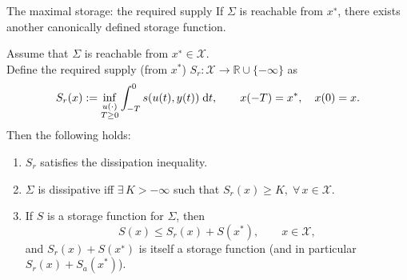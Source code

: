 \documentclass[aspectratio=169]{beamer}
\newcommand{\bbR}{\mathbb{R}}
\begin{document}
\begin{frame}{The maximal storage: the required supply}
	If $\Sigma$ is reachable from $x^∗$, there
	exists another canonically defined storage function. 
\begin{theorem}
	Assume that $\Sigma$ is reachable from $x^∗ \in \mathcal{X}$. \\
	Define the required supply (from $x^*$) $S_r : \mathcal{X} \rightarrow \bbR \cup \{-\infty\}$ as
\begin{equation}\label{eq:Sr}
	S_r(x) := \inf_{\substack{u(\cdot) \\ T \ge 0}} \int_{-T}^0 s(u(t), y(t)) \d t, \qquad x(-T)=x^*, \quad x(0)=x.
\end{equation}
Then the following holds:
\begin{enumerate}
	\item $S_r$ satisfies the dissipation inequality. 
	\item $\Sigma$ is dissipative iff $\exists\, K > −\infty$ such that $S_r (x) \ge K, \; \forall \, x \in \mathcal{X}$.
	\item If $S$ is a 	storage function for $\Sigma$, then
	\begin{equation*}
		S(x) \le S_r(x) + S(x^*), \qquad x \in \mathcal{X},
	\end{equation*}
	and $S_r(x) + S(x^∗)$ is itself a storage function (and in particular $S_r(x) + S_a(x^*)$). 
\end{enumerate}


\end{theorem}
\end{frame}
\end{document}
